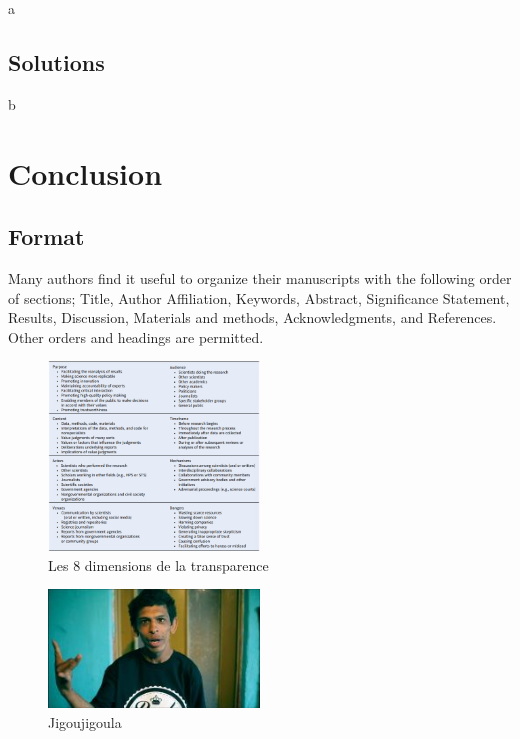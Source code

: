 \documentclass[9pt,twocolumn,twoside,]{pnas-new}
\begin{document}
a

\hypertarget{solutions}{%
\subsection*{Solutions}\label{solutions}}

b

\hypertarget{conclusion}{%
\section*{Conclusion}\label{conclusion}}

\hypertarget{format}{%
\subsection*{Format}\label{format}}

Many authors find it useful to organize their manuscripts with the
following order of sections; Title, Author Affiliation, Keywords,
Abstract, Significance Statement, Results, Discussion, Materials and
methods, Acknowledgments, and References. Other orders and headings are
permitted.

\begin{figure}
\centering
\includegraphics[width=0.5\textwidth,height=0.4\textheight]{Transparence.png}
\caption{Les 8 dimensions de la transparence}
\end{figure}

\begin{figure}
\centering
\includegraphics[width=0.5\textwidth,height=0.4\textheight]{Istadbut.jpg}
\caption{Jigoujigoula}
\end{figure}
\end{document}

